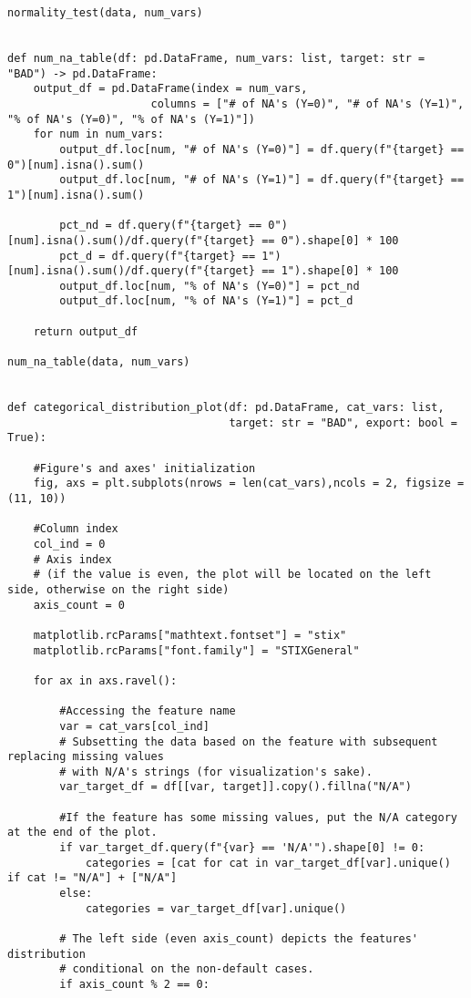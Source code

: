 \begin{lstlisting}[basicstyle=\footnotesize\ttfamily]
normality_test(data, num_vars)


def num_na_table(df: pd.DataFrame, num_vars: list, target: str = "BAD") -> pd.DataFrame:
    output_df = pd.DataFrame(index = num_vars,
                      columns = ["# of NA's (Y=0)", "# of NA's (Y=1)",  "% of NA's (Y=0)", "% of NA's (Y=1)"])
    for num in num_vars:
        output_df.loc[num, "# of NA's (Y=0)"] = df.query(f"{target} == 0")[num].isna().sum()
        output_df.loc[num, "# of NA's (Y=1)"] = df.query(f"{target} == 1")[num].isna().sum()

        pct_nd = df.query(f"{target} == 0")[num].isna().sum()/df.query(f"{target} == 0").shape[0] * 100
        pct_d = df.query(f"{target} == 1")[num].isna().sum()/df.query(f"{target} == 1").shape[0] * 100
        output_df.loc[num, "% of NA's (Y=0)"] = pct_nd
        output_df.loc[num, "% of NA's (Y=1)"] = pct_d

    return output_df

num_na_table(data, num_vars)


def categorical_distribution_plot(df: pd.DataFrame, cat_vars: list,
                                  target: str = "BAD", export: bool = True):
    
    #Figure's and axes' initialization
    fig, axs = plt.subplots(nrows = len(cat_vars),ncols = 2, figsize = (11, 10))

    #Column index
    col_ind = 0
    # Axis index
    # (if the value is even, the plot will be located on the left side, otherwise on the right side)
    axis_count = 0
    
    matplotlib.rcParams["mathtext.fontset"] = "stix"
    matplotlib.rcParams["font.family"] = "STIXGeneral"
    
    for ax in axs.ravel():

        #Accessing the feature name
        var = cat_vars[col_ind]
        # Subsetting the data based on the feature with subsequent replacing missing values
        # with N/A's strings (for visualization's sake).
        var_target_df = df[[var, target]].copy().fillna("N/A")
        
        #If the feature has some missing values, put the N/A category at the end of the plot.
        if var_target_df.query(f"{var} == 'N/A'").shape[0] != 0:
            categories = [cat for cat in var_target_df[var].unique() if cat != "N/A"] + ["N/A"]
        else:
            categories = var_target_df[var].unique()

        # The left side (even axis_count) depicts the features' distribution
        # conditional on the non-default cases.
        if axis_count % 2 == 0:


\end{lstlisting}
